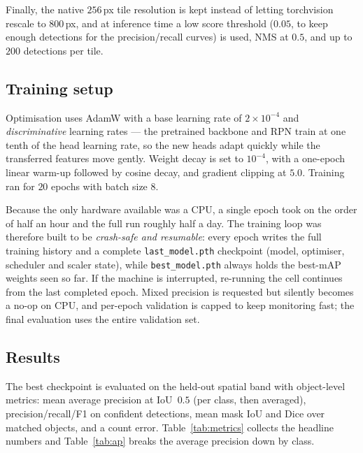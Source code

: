 \documentclass{aa}
\begin{document}
Finally, the native $256$\,px tile resolution is kept instead of letting torchvision
rescale to $800$\,px, and at inference time a low score threshold ($0.05$, to
keep enough detections for the precision/recall curves) is used, NMS at $0.5$, and up to
$200$ detections per tile.

\subsection{Training setup}
\label{sec:training}
Optimisation uses AdamW \citep{loshchilov2019adamw} with a base learning rate of
$2\times10^{-4}$ and \emph{discriminative} learning rates --- the pretrained
backbone and RPN train at one tenth of the head learning rate, so the new heads
adapt quickly while the transferred features move gently. Weight decay is set to
$10^{-4}$, with a one-epoch linear warm-up followed by cosine decay, and gradient
clipping at $5.0$. Training ran for $20$ epochs with batch size $8$.

Because the only hardware available was a CPU, a single epoch took on the
order of half an hour and the full run roughly half a day. The
training loop was therefore built to be \emph{crash-safe and resumable}: every epoch
writes the full training history and a complete \texttt{last\_model.pth} checkpoint
(model, optimiser, scheduler and scaler state), while \texttt{best\_model.pth} always
holds the best-mAP weights seen so far. If the machine is interrupted, re-running the
cell continues from the last completed epoch. Mixed precision is requested but silently
becomes a no-op on CPU, and per-epoch validation is capped to keep monitoring fast;
the final evaluation uses the entire validation set.

\subsection{Results}
\label{sec:results}
The best checkpoint is evaluated on the held-out spatial band with object-level
metrics: mean average precision at IoU~$0.5$ (per class, then averaged),
precision/recall/F1 on confident detections, mean mask IoU and Dice over matched
objects, and a count error. Table~\ref{tab:metrics} collects the headline numbers
and Table~\ref{tab:ap} breaks the average precision down by class.
\end{document}
